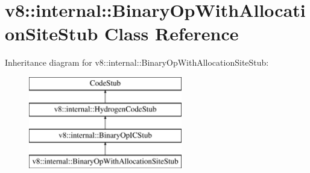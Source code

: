 \hypertarget{classv8_1_1internal_1_1_binary_op_with_allocation_site_stub}{}\section{v8\+:\+:internal\+:\+:Binary\+Op\+With\+Allocation\+Site\+Stub Class Reference}
\label{classv8_1_1internal_1_1_binary_op_with_allocation_site_stub}
Inheritance diagram for v8\+:\+:internal\+:\+:Binary\+Op\+With\+Allocation\+Site\+Stub\+:\begin{figure}[H]
\begin{center}
\leavevmode
\includegraphics[height=4.000000cm]{classv8_1_1internal_1_1_binary_op_with_allocation_site_stub}
\end{center}
\end{figure}
